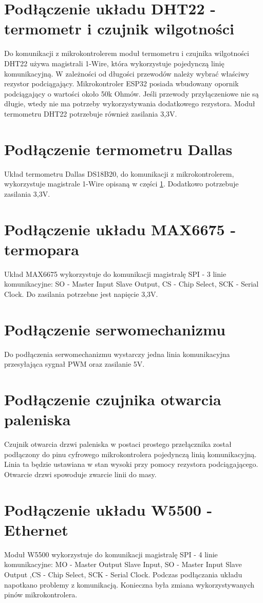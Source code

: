 \documentclass[11pt]{report}
\begin{document}
 \section{Podłączenie układu DHT22 - termometr i czujnik wilgotności}\label{dht}
 Do komunikacji z mikrokontrolerem moduł termometru i czujnika wilgotności DHT22  używa magistrali 1-Wire, która wykorzystuje pojedynczą linię komunikacyjną. W zależności od długości przewodów należy wybrać właściwy rezystor podciągający.  Mikrokontroler ESP32 posiada wbudowany opornik podciągający o wartości około 50k Ohmów. Jeśli przewody przyłączeniowe nie są długie, wtedy nie ma potrzeby wykorzystywania dodatkowego rezystora.
 Moduł termometru DHT22 potrzebuje również zasilania 3,3V.
 
 \section{Podłączenie termometru Dallas}
 Układ termometru Dallas DS18B20, do komunikacji z mikrokontrolerem, wykorzystuje magistrale 1-Wire opisaną w części \ref{dht}. Dodatkowo potrzebuje zasilania 3,3V.
 
 \section{Podłączenie układu MAX6675 - termopara}
 Układ MAX6675 wykorzystuje do komunikacji magistralę SPI - 3 linie komunikacyjne: SO - Master Input Slave Output, CS - Chip Select, SCK - Serial Clock. Do zasilania potrzebne jest napięcie 3,3V.
 
 \section{Podłączenie serwomechanizmu}
 Do podłączenia serwomechanizmu wystarczy jedna linia komunikacyjna przesyłająca sygnał PWM oraz zasilanie 5V.
 
 \section{Podłączenie czujnika otwarcia paleniska}
 Czujnik otwarcia drzwi paleniska w postaci prostego przełącznika został podłączony do pinu cyfrowego mikrokontrolera pojedynczą linią komunikacyjną. Linia ta będzie ustawiana w stan wysoki przy pomocy rezystora podciągającego. Otwarcie drzwi spowoduje zwarcie linii do masy. 
 
  \section{Podłączenie układu W5500 - Ethernet}
 Moduł W5500 wykorzystuje do komunikacji magistralę SPI - 4 linie komunikacyjne: MO - Master Output Slave Input, SO - Master Input Slave Output ,CS - Chip Select, SCK - Serial Clock.
 Podczas podłączania układu napotkano problemy z komunikacją. Konieczna była zmiana wykorzystywanych pinów mikrokontrolera.
 
\end{document}
